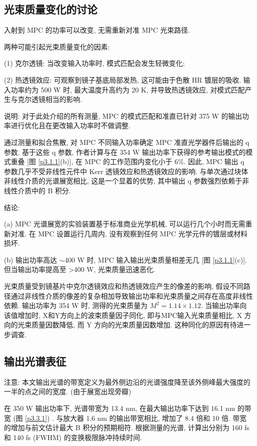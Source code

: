 \documentclass[14pt,a4paper,oneside]{article}
\numberwithin{equation}{subsection}             %
\numberwithin{figure}{subsection}               %
\begin{document}
\subsection{光束质量变化的讨论}

入射到 MPC 的功率可以改变, 无需重新对准 MPC 光束路径. 

两种可能引起光束质量变化的因素:

(1) 克尔透镜: 当改变输入功率时, 模式匹配会发生轻微变化;

(2) 热透镜效应: 可观察到镜子基底局部发热, 这可能由于色散 HR 镀层的吸收. 输入功率约为 500 W 时, 最大温度升高约为 20 K, 并导致热透镜效应, 对模式匹配产生与克尔透镜相当的影响. 

说明: 对于此处介绍的所有测量, MPC 的模式匹配和准直已针对 375 W 的输出功率进行优化且在更改输入功率时不做调整. 

通过测量和拟合焦散, 对 MPC 不同输入功率确定 MPC 准直光学器件后输出的 q 参数. 基于这些 q 参数, 作者计算与在 354 W 输出功率下获得的参考输出模式的模式重叠 [图 \ref{p3.1.1}(b)], 在 MPC 的工作范围内变化小于 6\%. 因此, MPC 输出 q 参数几乎不受非线性元件中 Kerr 透镜效应和热透镜效应的影响. 与单次通过块体非线性介质的光谱展宽相比, 这是一个显着的优势, 其中输出 q 参数强烈依赖于非线性介质中的 B 积分. 

结论: 

(a) MPC 光谱展宽的实验装置基于标准商业光学机械, 可以运行几个小时而无需重新对准. 在 MPC 设置运行几周内, 没有观察到任何 MPC 光学元件的镀层或材料损坏. 

(b) 输出功率高达 $\sim$400 W 时, MPC 输入输出光束质量相差无几 [图 \ref{p3.1.1}(c)]. 但当输出功率提高至 >400 W, 光束质量迅速恶化. 

光束质量受到镜基片中克尔透镜效应和热透镜效应产生的像差的影响, 假设不同路径通过非线性介质的像差的复杂相加导致输出功率和光束质量之间存在高度非线性依赖. 输出功率为 354 W 时, 测得的光束质量为 $M^2 =1.14 \times 1.12$. 当输出功率向该值增加时, X和Y方向上的波束质量因子同化, 即与MPC输入光束质量相比, X 方向的光束质量因数降低, 而 Y 方向的光束质量因数增加. 这种同化的原因有待进一步调查. 

\subsection{输出光谱表征}

注意: 本文输出光谱的带宽定义为最外侧边沿的光谱强度降至该外侧峰最大强度的一半的点之间的宽度. (由于展宽出现旁瓣)

在 350 W 输出功率下, 光谱带宽为 13.4 nm, 在最大输出功率下达到 16.1 nm 的带宽 (图 \ref{p3.3.1}) . 与放大器 1.6 nm 的输出带宽相比, 增加了 8.4 倍和 10 倍. 带宽的增加与前文估计最大 B 积分的预期相符. 根据测量的光谱, 计算出分别为 160 fs 和 140 fs (FWHM) 的变换极限脉冲持续时间. 
\end{document}
